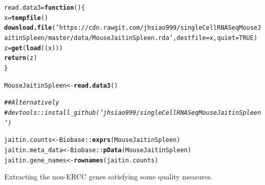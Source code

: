 \documentclass[12pt]{article}\usepackage[]{graphicx}\usepackage[usenames,dvipsnames]{color}
\makeatletter
\newcommand{\hlnum}[1]{\textcolor[rgb]{0.686,0.059,0.569}{#1}}%
\newcommand{\hlstr}[1]{\textcolor[rgb]{0.192,0.494,0.8}{#1}}%
\newcommand{\hlcom}[1]{\textcolor[rgb]{0.678,0.584,0.686}{\textit{#1}}}%
\newcommand{\hlopt}[1]{\textcolor[rgb]{0,0,0}{#1}}%
\newcommand{\hlstd}[1]{\textcolor[rgb]{0.345,0.345,0.345}{#1}}%
\newcommand{\hlkwa}[1]{\textcolor[rgb]{0.161,0.373,0.58}{\textbf{#1}}}%
\newcommand{\hlkwb}[1]{\textcolor[rgb]{0.69,0.353,0.396}{#1}}%
\newcommand{\hlkwc}[1]{\textcolor[rgb]{0.333,0.667,0.333}{#1}}%
\newcommand{\hlkwd}[1]{\textcolor[rgb]{0.737,0.353,0.396}{\textbf{#1}}}%
\newenvironment{kframe}{%
 \def\at@end@of@kframe{}%
 \ifinner\ifhmode%
  \def\at@end@of@kframe{\end{minipage}}%
  \begin{minipage}{\columnwidth}%
 \fi\fi%
 \def\FrameCommand##1{\hskip\@totalleftmargin \hskip-\fboxsep
 \colorbox{shadecolor}{##1}\hskip-\fboxsep
     \hskip-\linewidth \hskip-\@totalleftmargin \hskip\columnwidth}%
 \MakeFramed {\advance\hsize-\width
   \@totalleftmargin\z@ \linewidth\hsize
   \@setminipage}}%
 {\par\unskip\endMakeFramed%
 \at@end@of@kframe}
\newenvironment{knitrout}{}{} %
\makeatother
\begin{document}
\begin{knitrout}
\color{fgcolor}\begin{kframe}
\begin{alltt}
\hlstd{read.data3} \hlkwb{=} \hlkwa{function}\hlstd{() \{}
  \hlstd{x} \hlkwb{=} \hlkwd{tempfile}\hlstd{()}
  \hlkwd{download.file}\hlstd{(}\hlstr{'https://cdn.rawgit.com/jhsiao999/singleCellRNASeqMouseJaitinSpleen/master/data/MouseJaitinSpleen.rda'}\hlstd{,} \hlkwc{destfile} \hlstd{= x,} \hlkwc{quiet}\hlstd{=}\hlnum{TRUE}\hlstd{)}
  \hlstd{z} \hlkwb{=} \hlkwd{get}\hlstd{(}\hlkwd{load}\hlstd{((x)))}
  \hlkwd{return}\hlstd{(z)}
\hlstd{\}}

\hlstd{MouseJaitinSpleen} \hlkwb{<-} \hlkwd{read.data3}\hlstd{()}

\hlcom{## Alternatively}
\hlcom{# devtools::install_github('jhsiao999/singleCellRNASeqMouseJaitinSpleen')}
\end{alltt}
\end{kframe}
\end{knitrout}

\begin{knitrout}
\color{fgcolor}\begin{kframe}
\begin{alltt}
\hlstd{jaitin.counts} \hlkwb{<-} \hlstd{Biobase}\hlopt{::}\hlkwd{exprs}\hlstd{(MouseJaitinSpleen)}
\hlstd{jaitin.meta_data} \hlkwb{<-} \hlstd{Biobase}\hlopt{::}\hlkwd{pData}\hlstd{(MouseJaitinSpleen)}
\hlstd{jaitin.gene_names} \hlkwb{<-} \hlkwd{rownames}\hlstd{(jaitin.counts)}
\end{alltt}
\end{kframe}
\end{knitrout}

Extracting the non-ERCC genes satisfying some quality measures.
\end{document}
